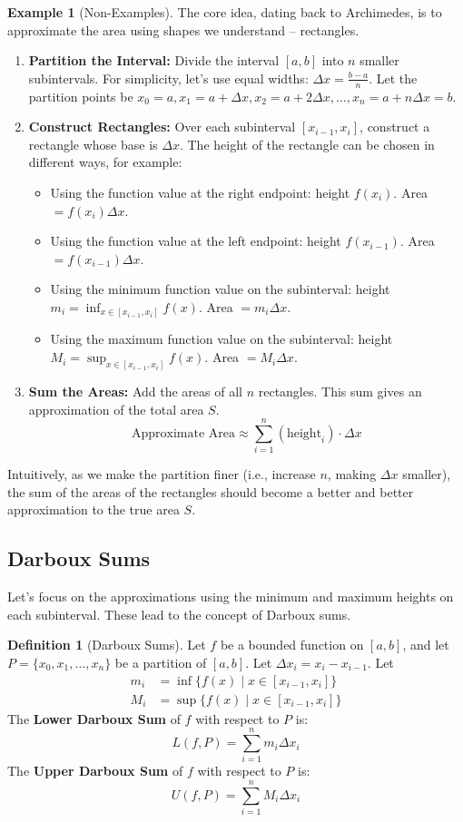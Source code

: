 \documentclass[11pt]{article}
\theoremstyle{plain}
\theoremstyle{definition}
\newtheorem{definition}[theorem]{Definition}
\newtheorem{example}[theorem]{Example}
\theoremstyle{remark}
\begin{document}
\begin{example}[Non-Examples]
The core idea, dating back to Archimedes, is to approximate the area using shapes we understand – rectangles.
\begin{enumerate}
    \item \textbf{Partition the Interval:} Divide the interval $[a,b]$ into $n$ smaller subintervals. For simplicity, let's use equal widths: $\Delta x = \frac{b-a}{n}$. Let the partition points be $x_0=a, x_1=a+\Delta x, x_2=a+2\Delta x, \dots, x_n=a+n\Delta x=b$.
    \item \textbf{Construct Rectangles:} Over each subinterval $[x_{i-1}, x_i]$, construct a rectangle whose base is $\Delta x$. The height of the rectangle can be chosen in different ways, for example:
        \begin{itemize}
            \item Using the function value at the right endpoint: height $f(x_i)$. Area $= f(x_i)\Delta x$.
            \item Using the function value at the left endpoint: height $f(x_{i-1})$. Area $= f(x_{i-1})\Delta x$.
            \item Using the minimum function value on the subinterval: height $m_i = \inf_{x \in [x_{i-1}, x_i]} f(x)$. Area $= m_i \Delta x$.
            \item Using the maximum function value on the subinterval: height $M_i = \sup_{x \in [x_{i-1}, x_i]} f(x)$. Area $= M_i \Delta x$.
        \end{itemize}
    \item \textbf{Sum the Areas:} Add the areas of all $n$ rectangles. This sum gives an approximation of the total area $S$.
    \[ \text{Approximate Area} \approx \sum_{i=1}^n (\text{height}_i) \cdot \Delta x \]
\end{enumerate}
Intuitively, as we make the partition finer (i.e., increase $n$, making $\Delta x$ smaller), the sum of the areas of the rectangles should become a better and better approximation to the true area $S$.

\subsection{Darboux Sums}

Let's focus on the approximations using the minimum and maximum heights on each subinterval. These lead to the concept of Darboux sums.

\begin{definition}[Darboux Sums]
Let $f$ be a bounded function on $[a,b]$, and let $P = \{x_0, x_1, \dots, x_n\}$ be a partition of $[a,b]$. Let $\Delta x_i = x_i - x_{i-1}$. Let
\begin{align*} m_i &= \inf \{ f(x) \mid x \in [x_{i-1}, x_i] \} \\ M_i &= \sup \{ f(x) \mid x \in [x_{i-1}, x_i] \} \end{align*}
The \textbf{Lower Darboux Sum} of $f$ with respect to $P$ is:
\[ L(f, P) = \sum_{i=1}^n m_i \Delta x_i \]
The \textbf{Upper Darboux Sum} of $f$ with respect to $P$ is:
\[ U(f, P) = \sum_{i=1}^n M_i \Delta x_i \]
\end{definition}


\end{example}
\end{document}
